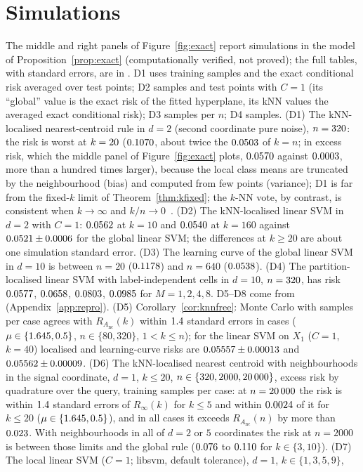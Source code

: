 \documentclass[11pt,a4paper]{article}
\theoremstyle{plain}
\theoremstyle{definition}
\theoremstyle{remark}
\newcommand{\Risk}{R}
\begin{document}
\section{Simulations}\label{app:sim}
The middle and right panels of Figure~\ref{fig:exact} report simulations in the model of Proposition~\ref{prop:exact} (computationally verified, not proved); the full tables, with standard errors, are in . D1 uses \ExDoneReps{} training samples and the exact conditional risk averaged over \ExDoneTest{} test points; D2 \ExDtwoReps{} samples and \ExDtwoTest{} test points with $C=1$ (its ``global'' value is the exact risk of the fitted hyperplane, its kNN values the averaged exact conditional risk); D3 \ExDthreeReps{} samples per $n$; D4 \ExDfourReps{} samples. (D1) The kNN-localised nearest-centroid rule in $d=2$ (second coordinate pure noise), $n=320$: the risk is worst at $k=20$ ($0.1070$, about twice the $0.0503$ of $k=n$; in excess risk, which the middle panel of Figure~\ref{fig:exact} plots, $0.0570$ against $0.0003$, more than a hundred times larger), because the local class means are truncated by the neighbourhood (bias) and computed from few points (variance); D1 is far from the fixed-$k$ limit of Theorem~\ref{thm:kfixed}; the $k$-NN vote, by contrast, is consistent when $k\to\infty$ and $k/n\to0$~\citep{stone1977}. (D2) The kNN-localised linear SVM in $d=2$ with $C=1$: $0.0562$ at $k=10$ and $0.0540$ at $k=160$ against $0.0521\pm0.0006$ for the global linear SVM; the differences at $k\ge20$ are about one simulation standard error. (D3) The learning curve of the global linear SVM in $d=10$ is \ExSvmCurveMonotone{} between $n=20$ ($0.1178$) and $n=640$ ($0.0538$). (D4) The partition-localised linear SVM with label-independent cells in $d=10$, $n=320$, has risk $0.0577$, $0.0658$, $0.0803$, $0.0985$ for $M=1,2,4,8$. D5--D8 come from  (Appendix~\ref{app:repro}). (D5) Corollary~\ref{cor:knnfree}: Monte Carlo with \KLSelReps{} samples per case agrees with $\Risk_{A_{\mathrm{nc}}}(k)$ within $1.4$ standard errors in \KLSelNRows{} cases ($\mu\in\{1.645,0.5\}$, $n\in\{80,320\}$, $1<k\le n$); for the linear SVM on $X_1$ ($C=1$, $k=40$) localised and learning-curve risks are $0.05557\pm0.00013$ and $0.05562\pm0.00009$. (D6) The kNN-localised nearest centroid with neighbourhoods in the signal coordinate, $d=1$, $k\le20$, $n\in\{320,2000,20\,000\}$, excess risk by quadrature over the query, \KLPtwoReps{} training samples per case: at $n=20\,000$ the risk is within $1.4$ standard errors of $\Risk_\infty(k)$ for $k\le5$ and within $0.0024$ of it for $k\le20$ ($\mu\in\{1.645,0.5\}$), and in all \KLPtwoNRows{} cases it exceeds $\Risk_{A_{\mathrm{nc}}}(n)$ by more than $0.023$. With neighbourhoods in all of $d=2$ or $5$ coordinates the risk at $n=2000$ is between those limits and the global rule ($0.076$ to $0.110$ for $k\in\{3,10\}$). (D7) The local linear SVM ($C=1$; libsvm, default tolerance), $d=1$, $k\in\{1,3,5,9\}$, 
\end{document}
